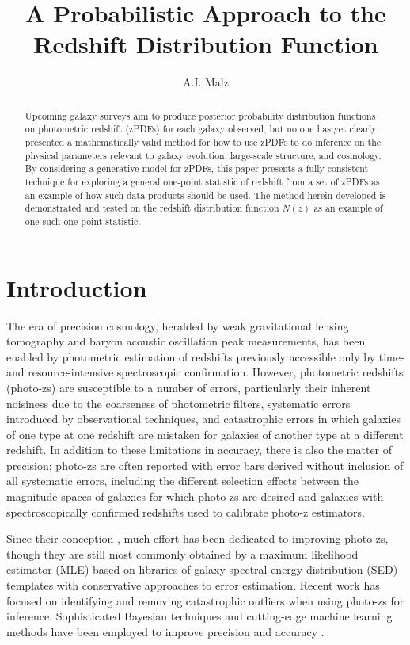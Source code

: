 \documentclass[preprint]{aastex}
\begin{document}
\title{A Probabilistic Approach to the Redshift Distribution Function}

\author{A.I. Malz}

\begin{abstract}
Upcoming galaxy surveys aim to produce posterior probability distribution 
functions on photometric redshift (zPDFs) for each galaxy observed, but no one 
has yet clearly presented a mathematically valid method for how to use zPDFs to 
do inference on the physical parameters relevant to galaxy evolution, 
large-scale structure, and cosmology.  By considering a generative model for 
zPDFs, this paper presents a fully consistent technique for exploring a general 
one-point statistic of redshift from a set of zPDFs as an example of how such 
data products should be used.  The method herein developed is demonstrated and 
tested on the redshift distribution function $N(z)$ as an example of one such 
one-point statistic.
\end{abstract}


\clearpage
\section{Introduction}
\label{sec:intro}

The era of precision cosmology, heralded by weak gravitational lensing 
tomography and baryon acoustic oscillation peak measurements, has been enabled 
by photometric estimation of redshifts previously accessible only by time- and 
resource-intensive spectroscopic confirmation.  However, photometric redshifts 
(photo-zs) are susceptible to a number of errors, particularly their inherent 
noisiness due to the coarseness of photometric filters, systematic errors 
introduced by observational techniques, and catastrophic errors in which 
galaxies of one type at one redshift are mistaken for galaxies of another type 
at a different redshift.  In addition to these limitations in accuracy, there 
is also the matter of precision; photo-zs are often reported with error bars 
derived without inclusion of all systematic errors, including the different 
selection effects between the magnitude-spaces of galaxies for which photo-zs 
are desired and galaxies with spectroscopically confirmed redshifts used to 
calibrate photo-z estimators.

Since their conception \citep{bau62}, much effort has been dedicated to 
improving photo-zs, though they are still most commonly obtained by a maximum 
likelihood estimator (MLE) based on libraries of galaxy spectral energy 
distribution (SED) templates with conservative approaches to error estimation.  
Recent work has focused on identifying and removing catastrophic outliers when 
using photo-zs for inference.  \citep{gor13}  Sophisticated Bayesian techniques 
and cutting-edge machine learning methods have been employed to improve 
precision \citep{car10} and accuracy \citep{sad15}. 
\end{document}
